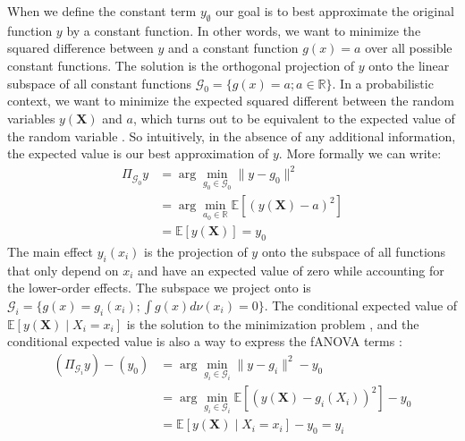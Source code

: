 When we define the constant term $y_\emptyset$ our goal is to best approximate the original function $y$ by a constant function. In other words, we want to minimize the squared difference between $y$ and a constant function $g(x) = a$ over all possible constant functions. The solution is the orthogonal projection of $y$ onto the linear subspace of all constant functions $\mathcal{G}_0 = \{g(x) = a; a \in \mathbb{R}\}$. In a probabilistic context, we want to minimize the expected squared different between the random variables $y(\boldsymbol{X})$ and $a$, which turns out to be equivalent to the expected value of the random variable \citep{Vaart_1998}. So intuitively, in the absence of any additional information, the expected value is our best approximation of $y$. More formally we can write:
\begin{align*}
    \Pi_{\mathcal{G}_0}y
    &= \arg \min_{g_0 \in \mathcal{G}_0} \|y - g_0\|^2 \\ %
    &= \arg \min_{a_0 \in \mathbb{R}} \mathbb{E}[(y(\boldsymbol{X}) - a)^2] \\ %
    &= \mathbb{E}[y(\boldsymbol{X})] = y_0
\end{align*}
The main effect $y_i(x_i)$ is the projection of $y$ onto the subspace of all functions that only depend on $x_i$ and have an expected value of zero while accounting for the lower-order effects. The subspace we project onto is $\mathcal{G}_i = \{g(x) = g_i(x_i); \int g(x) d\nu (x_i) = 0\}$.
The conditional expected value of $\mathbb{E}[y(\boldsymbol{X}) \mid X_i = x_i]$ is the solution to the minimization problem \citep{Vaart_1998}, and the conditional expected value is also a way to express the fANOVA terms \citep{muehlenstaedt2012}:
\begin{align*}
    (\Pi_{\mathcal{G}_i}y) - (y_0)
    &= \arg \min_{g_i \in \mathcal{G}_i} \|y - g_i\|^2 - y_0\\
    &= \arg \min_{g_i \in \mathcal{G}_i} \mathbb{E}[(y(\boldsymbol{X}) - g_i(X_i))^2] - y_0 \\
    &= \mathbb{E}[y(\boldsymbol{X}) \mid X_i = x_i] - y_0 = y_i\\
\end{align*}

